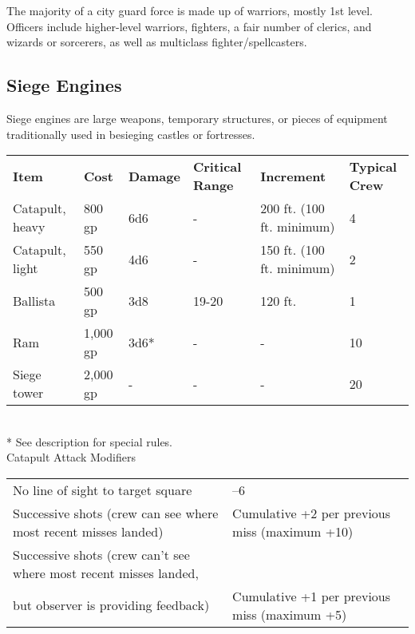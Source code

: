 The majority of a city guard force is made up of warriors, mostly 1st level. Officers include higher-level warriors, fighters, a fair number of clerics, and wizards or sorcerers, as well as multiclass fighter/spellcasters.
				
\subsection{Siege Engines}
Siege engines are large weapons, temporary structures, or pieces of equipment traditionally used in besieging castles or fortresses.

\begin{table*}[]
\sffamily
\caption{Siege Engines}
\begin{tabular}{llllll}
\textbf{Item} & \textbf{Cost} & \textbf{Damage} & \textbf{Critical Range} & \textbf{Increment} & \textbf{Typical Crew}\\
Catapult, heavy & 800 gp & 6d6 & - & 200 ft. (100 ft. minimum) & 4\\
Catapult, light & 550 gp & 4d6 & - & 150 ft. (100 ft. minimum) & 2\\
Ballista & 500 gp & 3d8 & 19-20 & 120 ft. & 1\\
Ram & 1,000 gp & 3d6* & - & - & 10\\
Siege tower & 2,000 gp & - & - & - & 20\\
\end{tabular}\\
* See description for special rules.\\

\textnormal{Catapult Attack Modifiers}\\
 \begin{tabular}{ll}
No line of sight to target square & --6\\
Successive shots (crew can see where most recent misses landed) & Cumulative +2 per previous miss (maximum +10)\\
Successive shots (crew can't see where most recent misses landed, & \\
but observer is providing feedback) & Cumulative +1 per previous miss (maximum +5)\\
 \end{tabular}
\end{table*}

